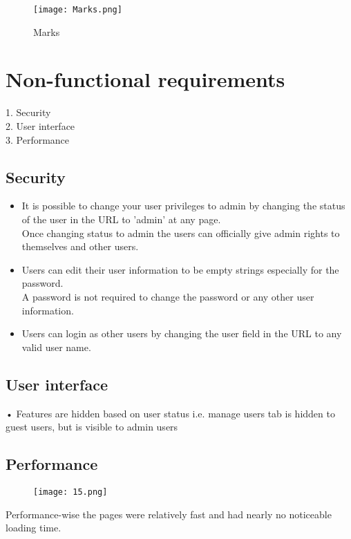 \documentclass[english]{article}
\begin{document}
\clearpage

\begin{figure}[ht!]
\center
\texttt{[image: Marks.png]}
\caption{Marks}
\end{figure}

\section{Non-functional requirements}
1.	Security\\
2.	User interface\\
3.	Performance\\

\subsection{Security}
\begin{itemize}
     \item It is possible to change your user privileges to admin by changing the status of the user in the URL to 'admin' at any page.\\
     Once changing status to admin the users can officially give admin rights to themselves and other users.
     \item Users can edit their user information to be empty strings especially for the password.\\
     A password is not required to change the password or any other user information.
     \item Users can login as other users by changing the user field in the URL to any valid user name.
   \end{itemize}

\subsection{User interface}
•	Features are hidden based on user status i.e. manage users tab is hidden to guest users, but is visible to admin users\\

\subsection{Performance}
\begin{figure}[H]
\texttt{[image: 15.png]}
\end{figure}
Performance-wise the pages were relatively fast and had nearly no noticeable loading time.
\end{document}
